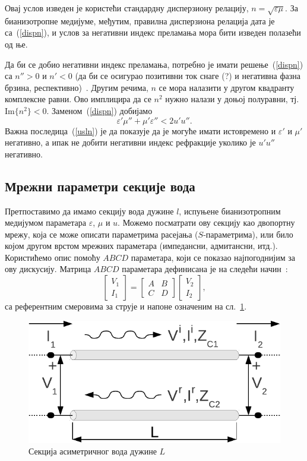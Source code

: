 Овај услов изведен је користећи стандардну дисперзиону релацију, $n=\sqrt{\varepsilon\mu}$. За бианизотропне медијуме, међутим, правилна дисперзиона релација дата је са~(\ref{dispn}), и услов за негативни индекс преламања мора бити изведен полазећи од ње.

Да би се добио негативни индекс преламања, потребно је имати решење~(\ref{dispn}) са $n''>0$ и $n'<0$ (да би се осигурао позитивни ток снаге (?) и негативна фазна брзина, респективно)~\cite{mccall}. Другим речима, $n$ се мора налазити у другом квадранту комплексне равни. Ово имплицира да се $n^2$ нужно налази у доњој полуравни, тј. $\mathrm{Im}\{n^2\}<0$. Заменом~(\ref{dispn}) добијамо
\begin{equation}\label{usln}
\varepsilon'\mu''+\mu'\varepsilon'' < 2u'u''.
\end{equation}
Важна последица~(\ref{usln}) је да показује да је могуће имати истовремено и $\varepsilon'$ и $\mu'$ негативно, а ипак не добити негативни индекс рефракције уколико је $u'u''$ негативно.

\subsection{Мрежни параметри секције вода}
Претпоставимо да имамо секцију вода дужине $l$, испуњене бианизотропним медијумом параметара $\varepsilon$, $\mu$ и $u$. Можемо посматрати ову секцију као двопортну мрежу, која се може описати параметрима расејања ($S$-параметрима), или било којом другом врстом мрежних параметара (импедансни, адмитансни, итд.). Користићемо опис помоћу $ABCD$ параметара, који се показао најпогоднијим за ову дискусију. Матрица $ABCD$ параметара дефинисана је на следећи начин~\cite{Pozar:05}:
\begin{equation}\label{abcd_osn}
\begin{bmatrix} V_1 \\ I_1 \end{bmatrix} = 
\begin{bmatrix} A & B \\ C & D \end{bmatrix}
\begin{bmatrix} V_2 \\ I_2 \end{bmatrix},
\end{equation}
са референтним смеровима за струје и напоне означеним на сл.~\ref{fpole}.
\begin{figure}[!t]
\centering
\includegraphics[width=0.5\columnwidth]{slike/sekcija.pdf}
\caption{Секција асиметричног вода дужине $L$}
\label{fpole}
\end{figure}

